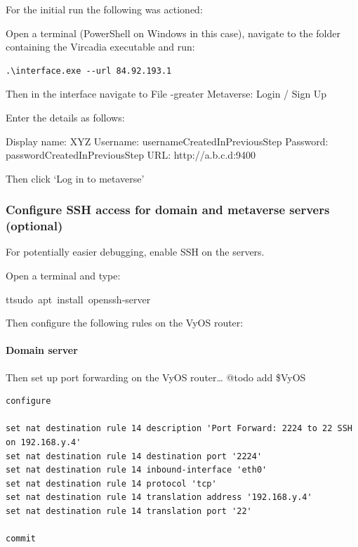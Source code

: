 For the initial run the following was actioned:

Open a terminal (PowerShell on Windows in this case), navigate to the
folder containing the Vircadia executable and run:

\begin{verbatim}
.\interface.exe --url 84.92.193.1
\end{verbatim}

Then in the interface navigate to File -greater{} Metaverse: Login
/ Sign Up

Enter the details as follows:

Display name: XYZ Username: usernameCreatedInPreviousStep Password:
passwordCreatedInPreviousStep URL: http://a.b.c.d:9400

Then click `Log in to metaverse'

\hypertarget{configure-ssh-access-for-domain-and-metaverse-servers-optional}{%
\subsubsection{Configure SSH access for domain and metaverse servers
(optional)}\label{configure-ssh-access-for-domain-and-metaverse-servers-optional}}

For potentially easier debugging, enable SSH on the servers.

Open a terminal and type:

tt{sudo\ apt\ install\ openssh-server}

Then configure the following rules on the VyOS router:

\hypertarget{domain-server}{%
\paragraph{Domain server}\label{domain-server}}

Then set up port forwarding on the VyOS router\ldots{} @todo add \$VyOS

\begin{verbatim}
configure

set nat destination rule 14 description 'Port Forward: 2224 to 22 SSH on 192.168.y.4'
set nat destination rule 14 destination port '2224'
set nat destination rule 14 inbound-interface 'eth0'
set nat destination rule 14 protocol 'tcp'
set nat destination rule 14 translation address '192.168.y.4'
set nat destination rule 14 translation port '22'

commit
\end{verbatim}

